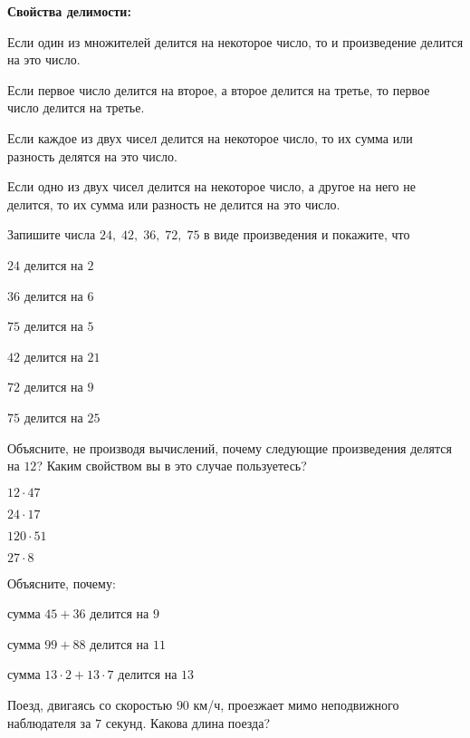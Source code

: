 \begin{listofex}
	\item \textbf{Свойства делимости:}
	\begin{enumcols}[itemcolumns=1]
		\item Если один из множителей делится на некоторое число, то и произведение делится на это число.
		\item Если первое число делится на второе, а второе делится на третье, то первое число делится на третье.
		\item Если каждое из двух чисел делится на некоторое число, то их сумма или разность делятся на это число.
		\item Если одно из двух чисел делится на некоторое число, а другое на него не делится, то их сумма или разность не делится на это число.
	\end{enumcols}
	\item Запишите числа \( 24,\;42,\;36,\;72,\;75 \) в виде произведения и покажите, что
	\begin{enumcols}[itemcolumns=3]
		\item \( 24 \) делится на \( 2 \)
		\item \( 36 \) делится на \( 6 \)
		\item \( 75 \) делится на \( 5 \)
		\item \( 42 \) делится на \( 21 \)
		\item \( 72 \) делится на \( 9 \)
		\item \( 75 \) делится на \( 25 \)
	\end{enumcols}
	\item Объясните, не производя вычислений, почему следующие произведения делятся на \( 12 \)? Каким свойством вы в это случае пользуетесь?
	\begin{enumcols}[itemcolumns=4]
		\item \( 12\cdot47 \)
		\item \( 24\cdot17 \)
		\item \( 120\cdot51 \)
		\item \( 27\cdot8 \)
	\end{enumcols}
	\item Объясните, почему:
	\begin{enumcols}[itemcolumns=2]
		\item сумма \( 45+36 \) делится на \( 9 \)
		\item сумма \( 99+88 \) делится на \( 11 \)
		\item сумма \( 13\cdot2+13\cdot7\) делится на \( 13 \)
	\end{enumcols}
	\item Поезд, двигаясь со скоростью \( 90 \) км/ч, проезжает мимо неподвижного наблюдателя за \( 7 \) секунд. Какова длина поезда?
\end{listofex}
